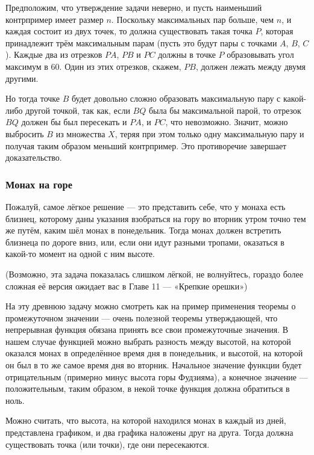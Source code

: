 Предположим, что утверждение задачи неверно, и пусть наименьший контрпример имеет размер $n$.
Поскольку максимальных пар больше, чем $n$, и каждая состоит из двух точек, то должна существовать такая точка $P$, которая принадлежит трём максимальным парам (пусть это будут пары с точками $A$, $B$, $C$).
Каждые два из отрезков $PA$, $PB$ и $PC$ должны в точке $P$ образовывать угол максимум в 60\degree.
Один из этих отрезков, скажем, $PB$, %
должен лежать между двумя другими.

Но тогда точке $B$ будет довольно сложно образовать максимальную пару с какой-либо другой точкой, так как, если $BQ$ была бы максимальной парой, то отрезок $BQ$ должен бы был пересекать и $PA$, и $PC$, что невозможно.
Значит, можно выбросить $B$ из множества $X$, теряя при этом только одну максимальную пару и получая таким образом меньший контрпример.
Это противоречие завершает доказательство.\heart

\subsubsection*{Монах на горе}%

Пожалуй, самое лёгкое решение --- это представить себе, что у монаха есть близнец, которому даны указания взобраться на гору во вторник утром точно тем же путём, каким шёл монах в понедельник.
Тогда монах должен встретить близнеца по дороге вниз, или, если они идут разными тропами, оказаться в какой-то момент на одной с ним высоте.\heart

(Возможно, эта задача показалась слишком лёгкой, не волнуйтесь, гораздо более сложная её версия ожидает вас в Главе 11 --- «Крепкие орешки»)

На эту древнюю задачу можно смотреть как на пример применения теоремы о промежуточном значении --- очень полезной теоремы утверждающей, что непрерывная функция обязана принять все свои промежуточные значения.
В нашем случае функцией можно выбрать разность между высотой, на которой оказался монах в определённое время дня в понедельник, и высотой, на которой он был в то же самое время дня во вторник.
Начальное значение функции будет отрицательным (примерно минус высота горы Фудзияма), а конечное значение --- положительным, таким образом, в некой точке функция должна обратиться в ноль.

Можно считать, что высота, на которой находился монах в каждый из дней, представлена графиком, и два графика наложены друг на друга.
Тогда должна существовать точка (или точки), где они пересекаются.

